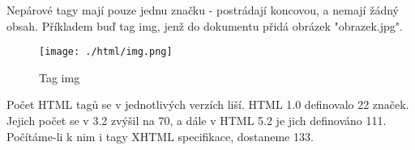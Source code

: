 \documentclass[main.tex]{subfiles}
\begin{document}
Nepárové tagy mají pouze jednu značku - postrádají koncovou, a nemají žádný obsah. Příkladem buď tag img, jenž do dokumentu přidá obrázek "obrazek.jpg".
		\begin{figure}[h]
			\centering
			\texttt{[image: ./html/img.png]}
			\caption{Tag img}
		\end{figure}

Počet HTML tagů se v jednotlivých verzích liší. HTML 1.0 definovalo 22 značek. Jejich počet se v 3.2 zvýšil na 70, a dále v HTML 5.2 je jich definováno 111. Počítáme-li k nim i tagy XHTML specifikace, dostaneme 133. \cite{web:wik:cz:html}
\end{document}
